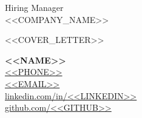 \documentclass[11pt,a4paper]{letter}
\begin{document}
\begin{letter}{Hiring Manager\\
<<COMPANY_NAME>>}

<<COVER_LETTER>>

\vspace{0.5cm}

\textbf{<<NAME>>}\\
\href{tel:<<PHONE_URI>>}{<<PHONE>>}\\
\href{mailto:<<EMAIL>>}{<<EMAIL>>}\\
\href{https://linkedin.com/in/<<LINKEDIN>>}{linkedin.com/in/<<LINKEDIN>>}\\
\href{https://github.com/<<GITHUB>>}{github.com/<<GITHUB>>}

\end{letter}
\end{document}

